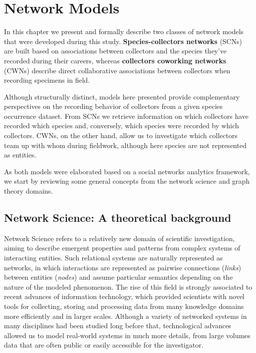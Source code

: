 \chapter{Network Models}\label{chapter:network_models}


In this chapter we present and formally describe two classes of network models that were developed during this study.
\textbf{Species-collectors networks} (SCNs) are built based on associations between collectors and the species they've recorded during their careers, whereas \textbf{collectors coworking networks} (CWNs) describe direct collaborative associations between collectors when recording specimens in field.

Although structurally distinct, models here presented provide complementary perspectives on the recording behavior of collectors from a given species occurrence dataset. 
From SCNs we retrieve information on which collectors have recorded which species and, conversely, which species were recorded by which collectors. 
CWNs, on the other hand, allow us to investigate which collectors team up with whom during fieldwork, although here species are not represented as entities.

As both models were elaborated based on a social networks analytics framework, we start by reviewing some general concepts from the network science and graph theory domains.




\section{Network Science: A theoretical background}

Network Science refers to a relatively new domain of scientific investigation, aiming to describe emergent properties and patterns from complex systems of interacting entities.
Such relational systems are naturally represented as networks, in which interactions are represented as pairwise connections (\textit{links}) between entities (\textit{nodes}) and assume particular semantics depending on the nature of the modeled phenomenon.
The rise of this field is strongly associated to recent advances of information technology, which provided scientists with novel tools for collecting, storing and processing data from many knowledge domains more efficiently and in larger scales.
Although a variety of networked systems in many disciplines had been studied long before that, technological advances allowed us to model real-world systems in much more details, from large volumes data that are often public or easily accessible for the investigator.


